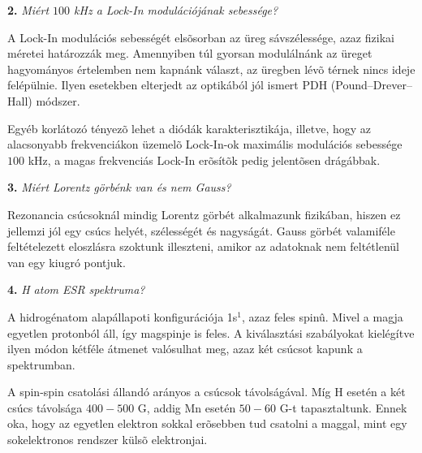 \documentclass[12pt,a4paper]{article}
\theoremstyle{plain}
\begin{document}
\vspace{5mm}

\textbf{2.} \textit{Miért $100$ kHz a Lock-In modulációjának sebessége?}

\vspace{5mm}

\par A Lock-In modulációs sebességét elsõsorban az üreg sávszélessége, azaz fizikai méretei határozzák meg. Amennyiben túl gyorsan
modulálnánk az üreget hagyományos értelemben nem kapnánk választ, az üregben lévõ térnek nincs ideje felépülnie. Ilyen esetekben
elterjedt az optikából jól ismert PDH (Pound--Drever--Hall) módszer.

\par Egyéb korlátozó tényezõ lehet a diódák karakterisztikája, illetve, hogy az alacsonyabb frekvenciákon üzemelõ Lock-In-ok maximális
modulációs sebessége $100$ kHz, a magas frekvenciás Lock-In erõsítõk pedig jelentõsen drágábbak.

\vspace{5mm}

\textbf{3.} \textit{Miért Lorentz görbénk van és nem Gauss?}

\vspace{5mm}

\par Rezonancia csúcsoknál mindig Lorentz görbét alkalmazunk 
fizikában, hiszen ez jellemzi jól egy csúcs helyét, szélességét
és nagyságát. Gauss görbét valamiféle feltételezett eloszlásra szoktunk 
illeszteni, amikor az adatoknak nem feltétlenül van egy kiugró pontjuk.

\vspace{5mm}

\textbf{4.} \textit{H atom ESR spektruma?}

\vspace{5mm}

\par A hidrogénatom alapállapoti konfigurációja 1s$^1$, azaz feles spinû. Mivel a magja egyetlen protonból áll, így magspinje is feles. 
A kiválasztási szabályokat kielégítve ilyen módon kétféle átmenet valósulhat meg, azaz két csúcsot kapunk a spektrumban.

\par A spin-spin csatolási állandó arányos a csúcsok távolságával. Míg H esetén a két csúcs távolsága $400-500$ G, addig Mn esetén $50-60$ G-t
tapasztaltunk. Ennek oka, hogy az egyetlen elektron sokkal erõsebben tud csatolni a maggal, mint egy sokelektronos rendszer külsõ elektronjai.
\end{document}
